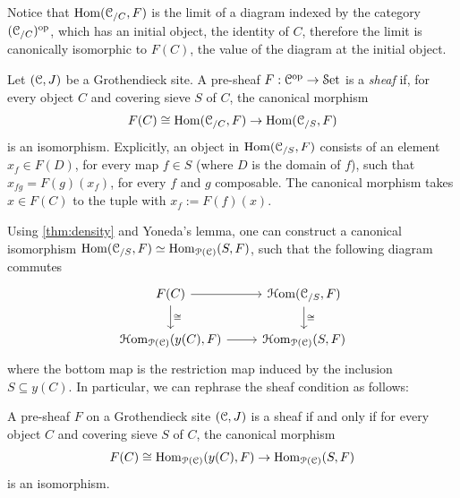 \documentclass[10pt]{amsart}
\begin{document}
	 Notice that $\mathrm{Hom}(\mathcal{C}_{/C},F)$ is the limit of a diagram indexed by the category $(\mathcal{C}_{/C})^{\mathrm{op}}$, which has an initial object, the identity of $C$, therefore the limit is canonically isomorphic to $F(C)$, the value of the diagram at the initial object.
	\begin{definition}
		Let $(\mathcal{C}, J)$ be a Grothendieck site. A {pre-sheaf} $F : \mathcal{C}^{\mathrm{op}} \to \mathcal{S}\mathrm{et}$ is a \emph{sheaf} if, for every object $C$ and covering sieve $S$ of $C$, the canonical morphism
		\[ F(C)\cong\mathrm{Hom}(\mathcal{C}_{/C},F) \to \mathrm{Hom}(\mathcal{C}_{/S},F)\]
		is an isomorphism. Explicitly, an object in $\mathrm{Hom}(\mathcal{C}_{/S},F)$ consists of an element $x_f\in F(D)$, for every map $f\in S$ (where $D$ is the domain of $f$), such that $x_{fg}=F(g)(x_f)$, for every $f$ and $g$ composable. The canonical morphism takes $x\in F(C)$ to the tuple with $x_f:=F(f)(x)$. 
	\end{definition}Using \cref{thm:density} and Yoneda's lemma, one can construct a canonical isomorphism $\mathrm{Hom}(\mathcal{C}_{/S},F)\simeq\mathrm{Hom}_{\mathcal{P}(\mathcal{C})}(S,F)$, such that the following diagram commutes \begin{equation}
		\begin{tikzcd}
			F(C) \arrow[d,"\cong"] \arrow[r] & \Hom(\lC_{/S},F) \arrow[d,"\cong"] \\
			\Hom_{\lP(\lC)}(y(C),F) \arrow[r] & \Hom_{\lP(\lC)}(S,F)
		\end{tikzcd}
	\end{equation}where the bottom map is the restriction map induced by the inclusion $S\subseteq y(C)$. In particular, we can rephrase the sheaf condition as follows:
	\begin{corollary}
		A pre-sheaf $F$ on a Grothendieck site $(\mathcal{C}, J)$ is a sheaf if and only if for every object $C$ and covering sieve $S$ of $C$, the canonical morphism
		\[ F(C)  \cong \mathrm{Hom}_{\mathcal{P}(\mathcal{C})}(y(C),F)\to \mathrm{Hom}_{\mathcal{P}(\mathcal{C})}(S,F) \]
		is an isomorphism. 
	\end{corollary}
	
\end{document}

